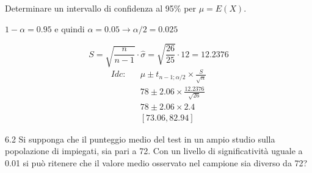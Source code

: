 \documentclass[
  11pt,
]{book}
\theoremstyle{mytheoremstyle}
\theoremstyle{mydefstyle}
\newenvironment{sol}
  {
  \begin{tcolorbox}[enhanced,breakable,arc=0.1mm,boxrule=1pt,colback=white,colframe=iblue,
  title=\bf \fontfamily{lmss}\selectfont \hspace{.5 cm} Soluzione,drop fuzzy shadow]

}{
\end{tcolorbox}
  }
\begin{document}
Determinare un intervallo di confidenza
al 95\% per \(\mu = E(X)\).

\begin{sol}
\(1-\alpha =0.95\) e quindi \(\alpha=0.05\rightarrow \alpha/2=0.025\)

\[
      S  =\sqrt{\frac {n}{n-1}}\cdot\hat\sigma =
     \sqrt{\frac { 26 }{ 25 }}\cdot 12 = 12.2376 
\]
\begin{eqnarray*}
  Idc: & &  \hat\mu \pm  t_{n-1;\alpha/2} \times \frac{S}{\sqrt{n}} \\
     & &  78 \pm  2.06 \times \frac{ 12.2376 }{\sqrt{ 26 }} \\
     & &  78 \pm  2.06 \times  2.4 \\
     & & [ 73.06 ,  82.94 ]
\end{eqnarray*}

\end{sol}

6.2 Si supponga che il punteggio medio del test in un ampio
studio sulla popolazione di impiegati, sia pari a 72.
Con un livello di significatività uguale a 0.01 si può
ritenere che il valore medio osservato nel campione sia
diverso da 72?
\end{document}
